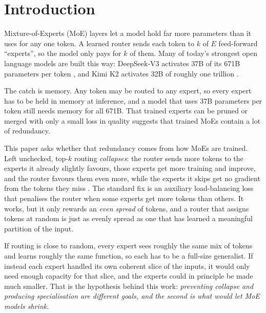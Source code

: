 \documentclass[10pt]{article}
\theoremstyle{definition}
\theoremstyle{remark}
\begin{document}
\section{Introduction}
\label{sec:intro}

Mixture-of-Experts (MoE) layers \citep{jacobs1991adaptive,shazeer2017outrageously} let a model hold far more parameters than it uses for any one token. A learned router sends each token to $k$ of $E$ feed-forward ``experts'', so the model only pays for $k$ of them. Many of today's strongest open language models are built this way: DeepSeek-V3 activates 37B of its 671B parameters per token \citep{deepseekai2024v3}, and Kimi K2 activates 32B of roughly one trillion \citep{kimiteam2025k2}.

The catch is memory. Any token may be routed to any expert, so every expert has to be held in memory at inference, and a model that uses 37B parameters per token still needs memory for all 671B. That trained experts can be pruned or merged with only a small loss in quality \citep{lu2024notall,li2024mcsmoe} suggests that trained MoEs contain a lot of redundancy.

This paper asks whether that redundancy comes from how MoEs are trained. Left unchecked, top-$k$ routing \emph{collapses}: the router sends more tokens to the experts it already slightly favours, those experts get more training and improve, and the router favours them even more, while the experts it skips get no gradient from the tokens they miss \citep{shazeer2017outrageously,fedus2022switch}. The standard fix is an auxiliary load-balancing loss \citep{lepikhin2021gshard,fedus2022switch} that penalises the router when some experts get more tokens than others. It works, but it only rewards an \emph{even spread} of tokens, and a router that assigns tokens at random is just as evenly spread as one that has learned a meaningful partition of the input.

If routing is close to random, every expert sees roughly the same mix of tokens and learns roughly the same function, so each has to be a full-size generalist. If instead each expert handled its own coherent slice of the inputs, it would only need enough capacity for that slice, and the experts could in principle be made much smaller. That is the hypothesis behind this work: \emph{preventing collapse and producing specialisation are different goals, and the second is what would let MoE models shrink.}
\end{document}
